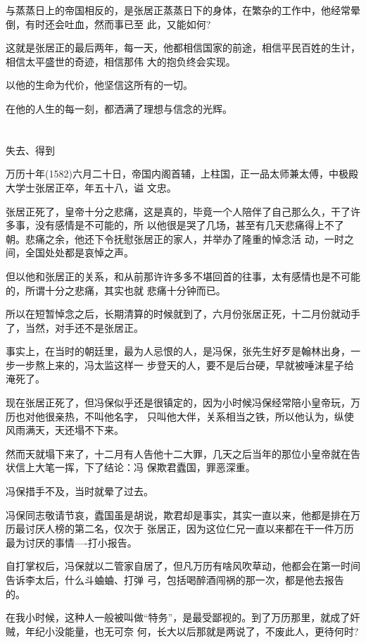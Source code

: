 \documentclass[11pt,a4paper,onecolumn]{article}
\begin{document}
与蒸蒸日上的帝国相反的，是张居正蒸蒸日下的身体，在繁杂的工作中，他经常晕倒，有时还会吐血，然而事已至
此，又能如何?

这就是张居正的最后两年，每一天，他都相信国家的前途，相信平民百姓的生计，相信太平盛世的奇迹，相信那伟
大的抱负终会实现。

以他的生命为代价，他坚信这所有的一切。

在他的人生的每一刻，都洒满了理想与信念的光辉。

\section[\thesection]{}

失去、得到

万历十年(1582)六月二十日，帝国内阁首辅，上柱国，正一品太师兼太傅，中极殿大学士张居正卒，年五十八，谥
文忠。

张居正死了，皇帝十分之悲痛，这是真的，毕竟一个人陪伴了自己那么久，干了许多事，没有感情是不可能的，所
以他很是哭了几场，甚至有几天悲痛得上不了朝。悲痛之余，他还下令抚慰张居正的家人，并举办了隆重的悼念活
动，一时之间，全国处处都是哀悼之声。

但以他和张居正的关系，和从前那许许多多不堪回首的往事，太有感情也是不可能的，所谓十分之悲痛，其实也就
悲痛十分钟而已。

所以在短暂悼念之后，长期清算的时候就到了，六月份张居正死，十二月份就动手了，当然，对手还不是张居正。

事实上，在当时的朝廷里，最为人忌恨的人，是冯保，张先生好歹是翰林出身，一步一步熬上来的，冯太监这样一
步登天的人，要不是后台硬，早就被唾沫星子给淹死了。

现在张居正死了，但冯保似乎还是很镇定的，因为小时候冯保经常陪小皇帝玩，万历也对他很亲热，不叫他名字，
只叫他大伴，关系相当之铁，所以他认为，纵使风雨满天，天还塌不下来。

然而天就塌下来了，十二月有人告他十二大罪，几天之后当年的那位小皇帝就在告状信上大笔一挥，下了结论：冯
保欺君蠹国，罪恶深重。

冯保措手不及，当时就晕了过去。

冯保同志敬请节哀，蠹国虽是胡说，欺君却是事实，其实一直以来，他都是排在万历最讨厌人榜的第二名，仅次于
张居正，因为这位仁兄一直以来都在干一件万历最为讨厌的事情----打小报告。

自打掌权后，冯保就以二管家自居了，但凡万历有啥风吹草动，他都会在第一时间告诉李太后，什么斗蛐蛐、打弹
弓，包括喝醉酒闯祸的那一次，都是他去报告的。

在我小时候，这种人一般被叫做``特务''，是最受鄙视的。到了万历那里，就成了奸贼，年纪小没能量，也无可奈
何，长大以后那就是两说了，不废此人，更待何时?
\end{document}
